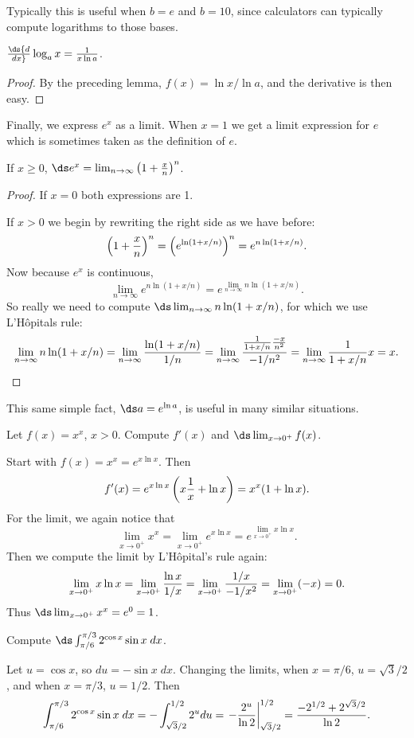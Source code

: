 \begin{theorem}
\begin{theorem}
\begin{theorem}
\begin{theorem}
Typically this is useful when $b=e$ and $b=10$, since calculators can
typically compute logarithms to those bases.


\begin{theorem} $\ds{d\over dx} \log _a x = {1\over x\ln a}$.
\begin{proof}
By the preceding lemma, $f(x) =\ln x/\ln a$, and the derivative is
then easy.
\end{proof}

Finally, we express $e^x$ as a limit. When $x=1$ we get a limit
expression for $e$ which is sometimes taken as the definition of
$e$.

\begin{theorem} If $x\geq 0$,
$\ds e^x = \lim_{n\to\infty} \left(
1+{x\over n}\right)^n$.
\begin{proof}
If $x=0$ both expressions are 1.

If $x>0$ we begin by rewriting the right side as we have  before:
$$\left(1+{x\over n}\right)^n=\left(e^{\ln (1+x/n)}\right)^n=
e^{n\ln (1+x/n)}.$$
Now because $e^x$ is continuous,
$$\lim_{n\to\infty}e^{n\ln (1+x/n)}=e^{\lim_{n\to\infty}n\ln (1+x/n)}.$$
So really we need to compute $\ds\lim_{n\to\infty}n\ln (1+x/n)$, for
which we use L'H\^opitals rule:
$$\lim_{n\to\infty}n\ln (1+x/n)=\lim_{n\to\infty}{\ln (1+x/n)\over 1/n}=
\lim_{n\to\infty}{{1\over 1+x/n}{-x\over n^2} \over -1/n^2}=
\lim_{n\to\infty}{1\over 1+x/n}x = x.$$
\end{proof}

This same simple fact, $\ds a=e^{\ln a}$, is useful in many similar
situations.


\begin{example} Let $f(x) =x^x$, $x>0$. Compute $f'(x)$ and
$\ds\lim_{x\to0^+} f(x)$.

Start with $f(x)=x^x = e^{x\ln x}$. Then 
$$f'(x)=e^{x\ln x}\left(x{1\over x}+\ln x\right)=x^x(1+\ln x).$$
For the limit, we again notice that
$$\lim_{x\to0^+} x^x = \lim_{x\to0^+}e^{x\ln x}
=e^{\lim_{x\to0^+} x\ln x}.$$
Then we compute the limit by L'H\^opital's rule again:
$$\lim_{x\to0^+}x\ln x = \lim_{x\to0^+}{\ln x\over 1/x}=
\lim_{x\to0^+}{1/x\over -1/x^2}=\lim_{x\to0^+}(-x)=0.$$
Thus $\ds\lim_{x\to0^+} x^x=e^0=1$.
\end{example}

\begin{example} Compute $\ds\int_{\pi/6}^{\pi/3} 2^{\cos x} \sin x\; dx$.

Let $u=\cos x$, so $du=-\sin x\;dx $. Changing the limits, when
$x=\pi/6$, $u =\sqrt{3}/2$, and when $x=\pi/3$,
$u=1/2$. Then
$$\int_{\pi/6}^{\pi/3} 2^{\cos x} \sin x\;dx
 =-\int_{\sqrt{3}/2}^{1/2} 2^u du
= \left.-{2^u\over\ln 2}\right|_{\sqrt{3}/2}^{1/2} 
  ={-2^{1/2} +2^{\sqrt{3}/2}\over\ln 2}.$$
\end{example}


\end{theorem}
\end{theorem}
\end{theorem}
\end{theorem}
\end{theorem}
\end{theorem}
